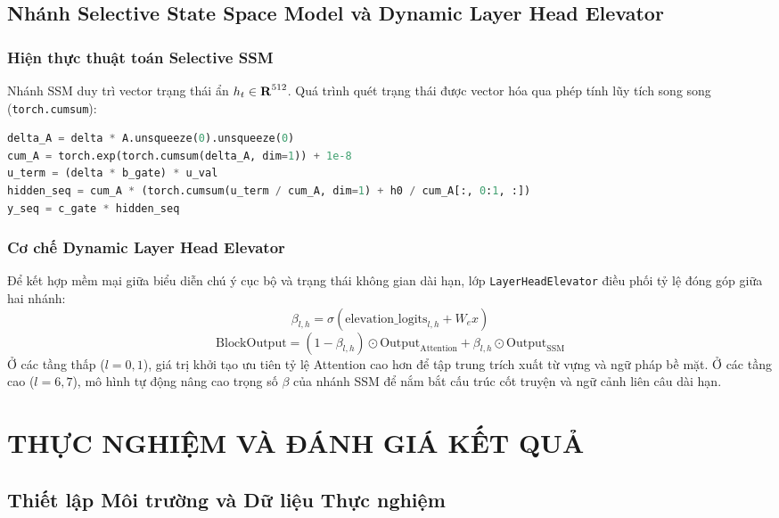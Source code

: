 \documentclass{uetgraduation}
\renewcommand{\mathbb}[1]{\text{\textbf{#1}}}
\begin{document}
\section{Nhánh Selective State Space Model và Dynamic Layer Head Elevator}
\subsection{Hiện thực thuật toán Selective SSM}
Nhánh SSM duy trì vector trạng thái ẩn $h_t \in \mathbb{R}^{512}$. Quá trình quét trạng thái được vector hóa qua phép tính lũy tích song song (\texttt{torch.cumsum}):
\begin{lstlisting}[language=Python]
delta_A = delta * A.unsqueeze(0).unsqueeze(0)
cum_A = torch.exp(torch.cumsum(delta_A, dim=1)) + 1e-8
u_term = (delta * b_gate) * u_val
hidden_seq = cum_A * (torch.cumsum(u_term / cum_A, dim=1) + h0 / cum_A[:, 0:1, :])
y_seq = c_gate * hidden_seq
\end{lstlisting}

\subsection{Cơ chế Dynamic Layer Head Elevator}
Để kết hợp mềm mại giữa biểu diễn chú ý cục bộ và trạng thái không gian dài hạn, lớp \texttt{LayerHeadElevator} điều phối tỷ lệ đóng góp giữa hai nhánh:
\begin{equation}
\beta_{l, h} = \sigma\left( \text{elevation\_logits}_{l, h} + W_e x \right)
\end{equation}
\begin{equation}
\text{BlockOutput} = (1 - \beta_{l, h}) \odot \text{Output}_{\text{Attention}} + \beta_{l, h} \odot \text{Output}_{\text{SSM}}
\end{equation}
Ở các tầng thấp ($l=0, 1$), giá trị khởi tạo ưu tiên tỷ lệ Attention cao hơn để tập trung trích xuất từ vựng và ngữ pháp bề mặt. Ở các tầng cao ($l=6, 7$), mô hình tự động nâng cao trọng số $\beta$ của nhánh SSM để nắm bắt cấu trúc cốt truyện và ngữ cảnh liên câu dài hạn.

\chapter{THỰC NGHIỆM VÀ ĐÁNH GIÁ KẾT QUẢ}
\section{Thiết lập Môi trường và Dữ liệu Thực nghiệm}
\end{document}

